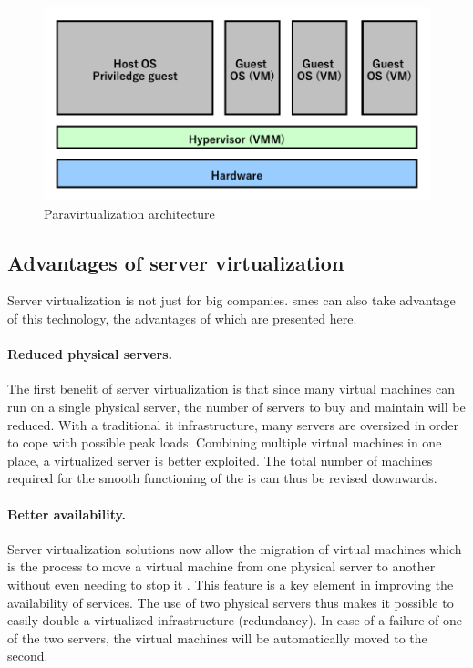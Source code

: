 \begin{figure}[!h]
    \centering
    \includegraphics[scale=0.65]{fig02/paravirtualization.pdf}
    \caption{Paravirtualization architecture}
    \label{fig:paravirtualization}
\end{figure}


\subsection{Advantages of server virtualization}
Server virtualization is not just for big companies. \acrshort{sme}s can also take advantage of this technology, the advantages of which are presented here.

\paragraph{Reduced physical servers.} The first benefit of server virtualization is that since many virtual machines can run on a single physical server, the number of servers to buy and maintain will be reduced. With a traditional \acrshort{it} infrastructure, many servers are oversized in order to cope with possible peak loads. Combining multiple virtual machines in one place, a virtualized server is better exploited. The total number of machines required for the smooth functioning of the \acrshort{is} can thus be revised downwards.

\paragraph{Better availability.} Server virtualization solutions now allow the migration of virtual machines which is the process to move a virtual machine from one physical server to another without even needing to stop it \citep{livemigration,livemigration2}. This feature is a key element in improving the availability of services. The use of two physical servers thus makes it possible to easily double a virtualized infrastructure (redundancy). In case of a failure of one of the two servers, the virtual machines will be automatically moved to the second.

